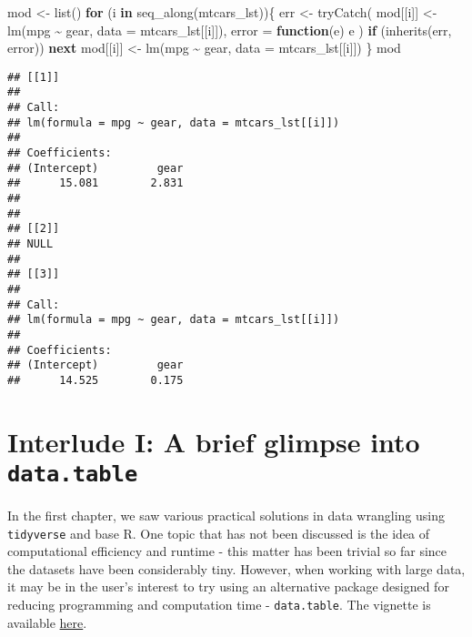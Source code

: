 \documentclass[
]{book}
\newenvironment{Shaded}{\begin{snugshade}}{\end{snugshade}}
\newcommand{\AttributeTok}[1]{\textcolor[rgb]{0.77,0.63,0.00}{#1}}
\newcommand{\ControlFlowTok}[1]{\textcolor[rgb]{0.13,0.29,0.53}{\textbf{#1}}}
\newcommand{\FunctionTok}[1]{\textcolor[rgb]{0.00,0.00,0.00}{#1}}
\newcommand{\NormalTok}[1]{#1}
\newcommand{\OtherTok}[1]{\textcolor[rgb]{0.56,0.35,0.01}{#1}}
\newcommand{\SpecialCharTok}[1]{\textcolor[rgb]{0.00,0.00,0.00}{#1}}
\newcommand{\StringTok}[1]{\textcolor[rgb]{0.31,0.60,0.02}{#1}}
\begin{document}
\begin{Shaded}
\begin{Highlighting}[]
\NormalTok{mod }\OtherTok{\textless{}{-}} \FunctionTok{list}\NormalTok{()}
\ControlFlowTok{for}\NormalTok{ (i }\ControlFlowTok{in} \FunctionTok{seq\_along}\NormalTok{(mtcars\_lst))\{}
\NormalTok{  err }\OtherTok{\textless{}{-}} \FunctionTok{tryCatch}\NormalTok{(}
\NormalTok{    mod[[i]] }\OtherTok{\textless{}{-}} \FunctionTok{lm}\NormalTok{(mpg }\SpecialCharTok{\textasciitilde{}}\NormalTok{ gear, }\AttributeTok{data =}\NormalTok{ mtcars\_lst[[i]]), }
    \AttributeTok{error =} \ControlFlowTok{function}\NormalTok{(e) e}
\NormalTok{  )}
  \ControlFlowTok{if}\NormalTok{ (}\FunctionTok{inherits}\NormalTok{(err, }\StringTok{\textquotesingle{}error\textquotesingle{}}\NormalTok{)) }\ControlFlowTok{next}
\NormalTok{  mod[[i]] }\OtherTok{\textless{}{-}} \FunctionTok{lm}\NormalTok{(mpg }\SpecialCharTok{\textasciitilde{}}\NormalTok{ gear, }\AttributeTok{data =}\NormalTok{ mtcars\_lst[[i]])}
\NormalTok{\}}
\NormalTok{mod}
\end{Highlighting}
\end{Shaded}

\begin{verbatim}
## [[1]]
## 
## Call:
## lm(formula = mpg ~ gear, data = mtcars_lst[[i]])
## 
## Coefficients:
## (Intercept)         gear  
##      15.081        2.831  
## 
## 
## [[2]]
## NULL
## 
## [[3]]
## 
## Call:
## lm(formula = mpg ~ gear, data = mtcars_lst[[i]])
## 
## Coefficients:
## (Intercept)         gear  
##      14.525        0.175
\end{verbatim}

\hypertarget{interlude-i-a-brief-glimpse-into-data.table}{%
\chapter{\texorpdfstring{Interlude I: A brief glimpse into \texttt{data.table}}{Interlude I: A brief glimpse into data.table}}\label{interlude-i-a-brief-glimpse-into-data.table}}

In the first chapter, we saw various practical solutions in data wrangling using \texttt{tidyverse} and base R. One topic that has not been discussed is the idea of computational efficiency and runtime - this matter has been trivial so far since the datasets have been considerably tiny. However, when working with large data, it may be in the user's interest to try using an alternative package designed for reducing programming and computation time - \texttt{data.table}. The vignette is available \href{https://rdatatable.gitlab.io/data.table/articles/datatable-intro.html}{here}.
\end{document}
